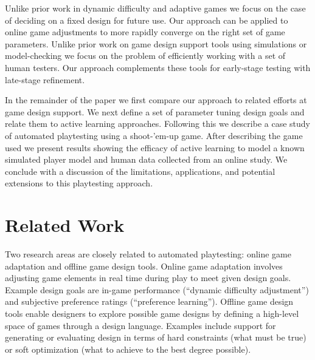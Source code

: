\documentclass{sig-alternate}
\begin{document}
Unlike prior work in dynamic difficulty and adaptive games we focus on the case of deciding on a fixed design for future use.
Our approach can be applied to online game adjustments to more rapidly converge on the right set of game parameters.
Unlike prior work on game design support tools using simulations or model-checking we focus on the problem of efficiently working with a set of human testers.
Our approach complements these tools for early-stage testing with late-stage refinement.

In the remainder of the paper we first compare our approach to related efforts at game design support.
We next define a set of parameter tuning design goals and relate them to active learning approaches.
Following this we describe a case study of automated playtesting using a shoot-'em-up game.
After describing the game used we present results showing the efficacy of active learning to model a known simulated player model and human data collected from an online study.
We conclude with a discussion of the limitations, applications, and potential extensions to this playtesting approach.




\section{Related Work}

Two research areas are closely related to automated playtesting: online game adaptation and offline game design tools.
Online game adaptation involves adjusting game elements in real time during play to meet given design goals.
Example design goals are in-game performance (``dynamic difficulty adjustment'') and subjective preference ratings (``preference learning'').
Offline game design tools enable designers to explore possible game designs by defining a high-level space of games through a design language.
Examples include support for generating or evaluating design in terms of hard constraints (what must be true) or soft optimization (what to achieve to the best degree possible).
\end{document}
